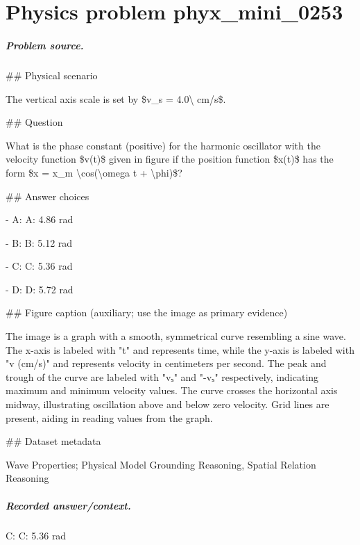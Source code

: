 
\chapter{Physics problem phyx\_mini\_0253}
\label{ch:PhyXMiniProblems_problem_phyx_mini_0253}

\paragraph{Problem source.}
\#\# Physical scenario

The vertical axis scale is set by \$v\_s = 4.0\textbackslash{} cm/s\$.

\#\# Question

What is the phase constant (positive) for the harmonic oscillator with the velocity function \$v(t)\$ given in figure if the position function \$x(t)\$ has the form \$x = x\_m \textbackslash{}cos(\textbackslash{}omega t + \textbackslash{}phi)\$?

\#\# Answer choices

- A: A: 4.86 rad

- B: B: 5.12 rad

- C: C: 5.36 rad

- D: D: 5.72 rad

\#\# Figure caption (auxiliary; use the image as primary evidence)

The image is a graph with a smooth, symmetrical curve resembling a sine wave. The x-axis is labeled with "t" and represents time, while the y-axis is labeled with "v (cm/s)" and represents velocity in centimeters per second. The peak and trough of the curve are labeled with "vₛ" and "-vₛ" respectively, indicating maximum and minimum velocity values. The curve crosses the horizontal axis midway, illustrating oscillation above and below zero velocity. Grid lines are present, aiding in reading values from the graph.

\#\# Dataset metadata

Wave Properties; Physical Model Grounding Reasoning, Spatial Relation Reasoning

\paragraph{Recorded answer/context.}
C: C: 5.36 rad

